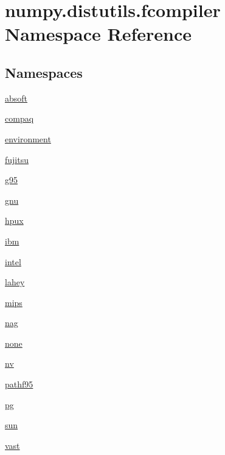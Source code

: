 \hypertarget{namespacenumpy_1_1distutils_1_1fcompiler}{}\section{numpy.\+distutils.\+fcompiler Namespace Reference}
\label{namespacenumpy_1_1distutils_1_1fcompiler}
\subsection*{Namespaces}
\begin{DoxyCompactItemize}
\item 
 \hyperlink{namespacenumpy_1_1distutils_1_1fcompiler_1_1absoft}{absoft}
\item 
 \hyperlink{namespacenumpy_1_1distutils_1_1fcompiler_1_1compaq}{compaq}
\item 
 \hyperlink{namespacenumpy_1_1distutils_1_1fcompiler_1_1environment}{environment}
\item 
 \hyperlink{namespacenumpy_1_1distutils_1_1fcompiler_1_1fujitsu}{fujitsu}
\item 
 \hyperlink{namespacenumpy_1_1distutils_1_1fcompiler_1_1g95}{g95}
\item 
 \hyperlink{namespacenumpy_1_1distutils_1_1fcompiler_1_1gnu}{gnu}
\item 
 \hyperlink{namespacenumpy_1_1distutils_1_1fcompiler_1_1hpux}{hpux}
\item 
 \hyperlink{namespacenumpy_1_1distutils_1_1fcompiler_1_1ibm}{ibm}
\item 
 \hyperlink{namespacenumpy_1_1distutils_1_1fcompiler_1_1intel}{intel}
\item 
 \hyperlink{namespacenumpy_1_1distutils_1_1fcompiler_1_1lahey}{lahey}
\item 
 \hyperlink{namespacenumpy_1_1distutils_1_1fcompiler_1_1mips}{mips}
\item 
 \hyperlink{namespacenumpy_1_1distutils_1_1fcompiler_1_1nag}{nag}
\item 
 \hyperlink{namespacenumpy_1_1distutils_1_1fcompiler_1_1none}{none}
\item 
 \hyperlink{namespacenumpy_1_1distutils_1_1fcompiler_1_1nv}{nv}
\item 
 \hyperlink{namespacenumpy_1_1distutils_1_1fcompiler_1_1pathf95}{pathf95}
\item 
 \hyperlink{namespacenumpy_1_1distutils_1_1fcompiler_1_1pg}{pg}
\item 
 \hyperlink{namespacenumpy_1_1distutils_1_1fcompiler_1_1sun}{sun}
\item 
 \hyperlink{namespacenumpy_1_1distutils_1_1fcompiler_1_1vast}{vast}
\end{DoxyCompactItemize}
